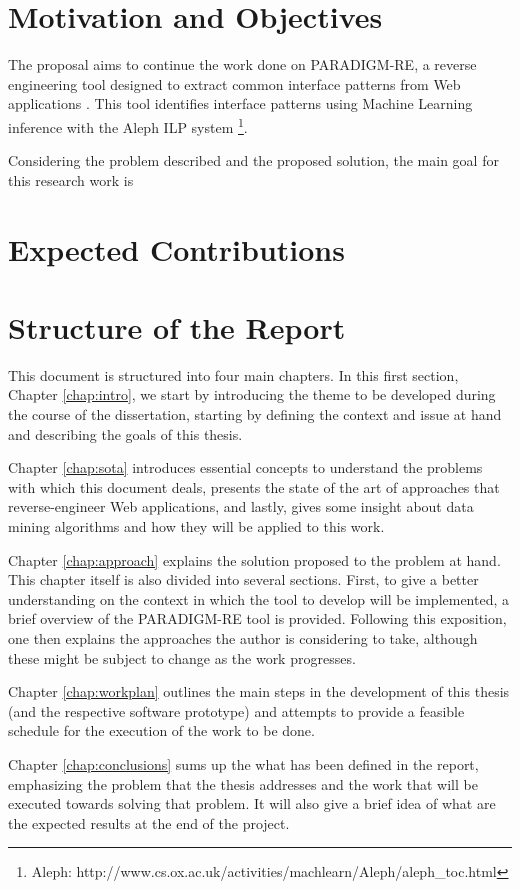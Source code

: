 \section{Motivation and Objectives} \label{sec:goals}
The proposal aims to continue the work done on PARADIGM-RE, a reverse engineering tool designed to extract common interface patterns from Web applications \cite{nabuco2013inferring}. This tool identifies interface patterns using Machine Learning inference with the Aleph ILP system \footnote{Aleph: http://www.cs.ox.ac.uk/activities/machlearn/Aleph/aleph\_toc.html}.

Considering the problem described and the proposed solution, the main goal for this research work is

\section{Expected Contributions} \label{sec:project}


\section{Structure of the Report} \label{sec:outline}

This document is structured into four main chapters. In this first section, Chapter \ref{chap:intro}, we start by introducing the theme to be developed during the course of the dissertation, starting by defining the context and issue at hand and describing the goals of this thesis.

Chapter \ref{chap:sota} introduces essential concepts to understand the problems with which this document deals, presents the state of the art of approaches that reverse-engineer Web applications, and lastly, gives some insight about data mining algorithms and how they will be applied to this work.

Chapter \ref{chap:approach} explains the solution proposed to the problem at hand. This chapter itself is also divided into several sections. First, to give a better understanding on the context in which the tool to develop will be implemented, a brief overview of the PARADIGM-RE tool is provided. Following this exposition, one then explains the approaches the author is considering to take, although these might be subject to change as the work progresses.

Chapter \ref{chap:workplan} outlines the main steps in the development of this thesis (and the respective software prototype) and attempts to provide a feasible schedule for the execution of the work to be done.

Chapter \ref{chap:conclusions} sums up the what has been defined in the report, emphasizing the problem that the thesis addresses and the work that will be executed towards solving that problem. It will also give a brief idea of what are the expected results at the end of the project.